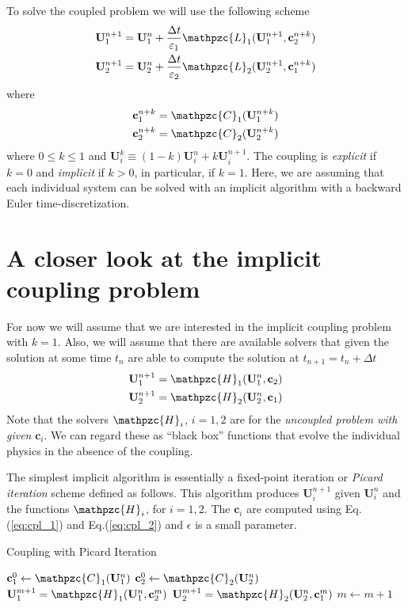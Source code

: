 \documentclass[11pt, reqno]{amsart}
\newcommand{\eqr}[1]{Eq.\thinspace(#1)}
\newcommand{\mvec}[1]{\mathbf{#1}}
\newcommand{\script}[1]{\mathpzc{#1}}
\theoremstyle{definition}
\begin{document}
To solve the coupled problem we will use the following scheme
\begin{align}
  \mvec{U}_1^{n+1} &= \mvec{U}_1^{n} + \frac{\Delta t}{\varepsilon_1}
  \script{L}_1(\mvec{U}_1^{n+1}, \mvec{c}_2^{n+k}) \\
  \mvec{U}_2^{n+1} &= \mvec{U}_2^{n} + \frac{\Delta t}{\varepsilon_2}
  \script{L}_2(\mvec{U}_2^{n+1}, \mvec{c}_1^{n+k})
\end{align}
where
\begin{align}
  \mvec{c}_1^{n+k} &= \script{C}_1(\mvec{U}_1^{n+k}) \\
  \mvec{c}_2^{n+k} &= \script{C}_2(\mvec{U}_2^{n+k})
\end{align}
where $0 \le k \le 1$ and $\mvec{U}_i^k \equiv
(1-k)\mvec{U}_i^n+k\mvec{U}_i^{n+1}$. The coupling is \emph{explicit}
if $k=0$ and \emph{implicit} if $k>0$, in particular, if $k=1$. Here,
we are assuming that each individual system can be solved with an
implicit algorithm with a backward Euler time-discretization.

\section{A closer look at the implicit coupling problem}

For now we will assume that we are interested in the implicit coupling
problem with $k=1$. Also, we will assume that there are available
solvers that given the solution at some time $t_n$ are able to compute
the solution at $t_{n+1} = t_n+\Delta t$
\begin{align}
  \mvec{U}_1^{n+1} &= \script{H}_1(\mvec{U}_1^n, \mvec{c}_2) \\
  \mvec{U}_2^{n+1} &= \script{H}_2(\mvec{U}_2^n, \mvec{c}_1)
\end{align}
Note that the solvers $\script{H}_i$, $i=1,2$ are for the
\emph{uncoupled problem with given} $\mvec{c}_i$. We can regard these
as ``black box'' functions that evolve the individual physics in the
absence of the coupling.

The simplest implicit algorithm is essentially a fixed-point iteration
or \emph{Picard iteration} scheme defined as follows. This algorithm
produces $\mvec{U}_i^{n+1}$ given $\mvec{U}_i^{n}$ and the functions
$\script{H}_i$, for $i=1,2$. The $\mvec{c}_i$ are computed using
\eqr{\ref{eq:cpl_1}} and \eqr{\ref{eq:cpl_2}} and $\epsilon$ is a
small parameter.
\begin{algorithm}
\caption{Coupling with Picard Iteration}
\begin{algorithmic}
\STATE $\mvec{c}_1^0 \leftarrow \script{C}_1(\mvec{U}_1^n)$
\STATE $\mvec{c}_2^0 \leftarrow \script{C}_2(\mvec{U}_2^n)$
\WHILE{$|\mvec{c}_1^{m+1}-\mvec{c}_1^m| > \epsilon$ and $|\mvec{c}_2^{m+1}-\mvec{c}_2^m| > \epsilon$}
\STATE $\mvec{U}_1^{m+1} = \script{H}_1(\mvec{U}_1^n, \mvec{c}_2^m)$
\STATE $\mvec{U}_2^{m+1} = \script{H}_2(\mvec{U}_2^n, \mvec{c}_1^m)$
\STATE $m \leftarrow m+1$
\ENDWHILE
\end{algorithmic}
\end{algorithm}
\end{document}
